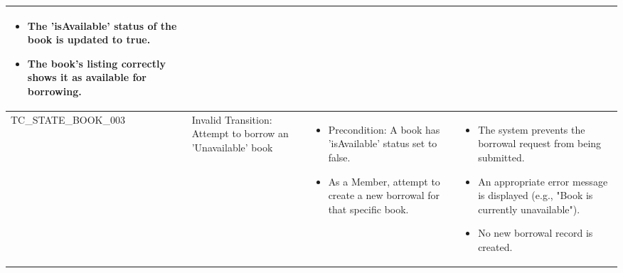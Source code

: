 \begin{longtable}{|>{\scriptsize\raggedright\arraybackslash}p{4cm}|>{\raggedright\arraybackslash}p{3cm}|>{\raggedright\arraybackslash}p{4cm}|>{\raggedright\arraybackslash}p{4cm}|}
\begin{itemize}[noitemsep, topsep=0pt, partopsep=0pt, leftmargin=*]
        \item The 'isAvailable' status of the book is updated to true.
        \item The book's listing correctly shows it as available for borrowing.
    \end{itemize} \\ \hline
TC\_STATE\_BOOK\_003 & Invalid Transition: Attempt to borrow an 'Unavailable' book & 
    \begin{itemize}[noitemsep, topsep=0pt, partopsep=0pt, leftmargin=*]
        \item Precondition: A book has 'isAvailable' status set to false.
        \item As a Member, attempt to create a new borrowal for that specific book. 
    \end{itemize} & 
    \begin{itemize}[noitemsep, topsep=0pt, partopsep=0pt, leftmargin=*]
        \item The system prevents the borrowal request from being submitted.
        \item An appropriate error message is displayed (e.g., "Book is currently unavailable").
        \item No new borrowal record is created.
    \end{itemize} \\ \hline


\end{longtable}
